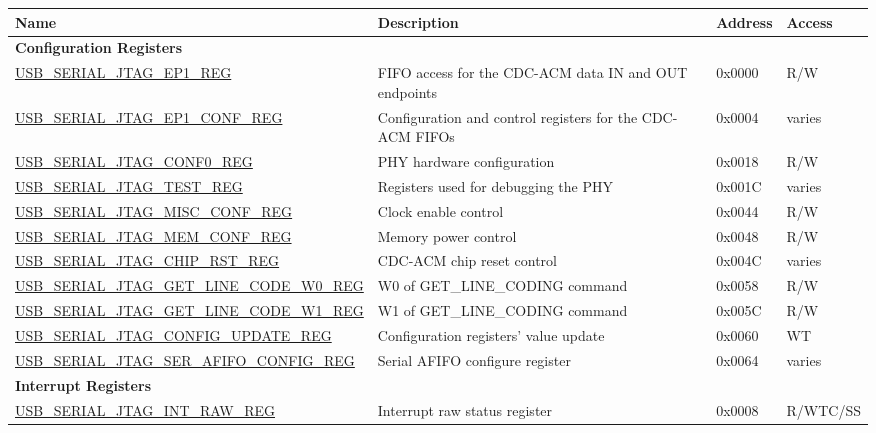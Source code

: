 \begin{longtable}{ | p{7.3cm} | p{5.7cm} | p{1.2cm} | p{1.5cm} | }
\hline\rowcolor{lightgray}
\textbf{Name} & \textbf{Description} &  \textbf{Address} & \textbf{Access} \\ \hline
\endhead
\multicolumn{4}{|l|}{\textbf{Configuration Registers}} \\ \hline
\hyperref[regdesc:USBSERIALJTAGEP1REG]{USB\_SERIAL\_JTAG\_EP1\_REG} & FIFO access for the CDC-ACM data IN and OUT endpoints & 0x0000 & R/W \\ \hline
\hyperref[regdesc:USBSERIALJTAGEP1CONFREG]{USB\_SERIAL\_JTAG\_EP1\_CONF\_REG} & Configuration and control registers for the CDC-ACM FIFOs & 0x0004 & varies \\ \hline
\hyperref[regdesc:USBSERIALJTAGCONF0REG]{USB\_SERIAL\_JTAG\_CONF0\_REG} & PHY hardware configuration & 0x0018 & R/W \\ \hline
\hyperref[regdesc:USBSERIALJTAGTESTREG]{USB\_SERIAL\_JTAG\_TEST\_REG} & Registers used for debugging the PHY & 0x001C & varies \\ \hline
\hyperref[regdesc:USBSERIALJTAGMISCCONFREG]{USB\_SERIAL\_JTAG\_MISC\_CONF\_REG} & Clock enable control & 0x0044 & R/W \\ \hline
\hyperref[regdesc:USBSERIALJTAGMEMCONFREG]{USB\_SERIAL\_JTAG\_MEM\_CONF\_REG} & Memory power control & 0x0048 & R/W \\ \hline
\hyperref[regdesc:USBSERIALJTAGCHIPRSTREG]{USB\_SERIAL\_JTAG\_CHIP\_RST\_REG} & CDC-ACM chip reset control & 0x004C & varies \\ \hline
\hyperref[regdesc:USBSERIALJTAGGETLINECODEW0REG]{USB\_SERIAL\_JTAG\_GET\_LINE\_CODE\_W0\_REG} & W0 of GET\_LINE\_CODING command & 0x0058 & R/W \\ \hline
\hyperref[regdesc:USBSERIALJTAGGETLINECODEW1REG]{USB\_SERIAL\_JTAG\_GET\_LINE\_CODE\_W1\_REG} & W1 of GET\_LINE\_CODING command & 0x005C & R/W \\ \hline
\hyperref[regdesc:USBSERIALJTAGCONFIGUPDATEREG]{USB\_SERIAL\_JTAG\_CONFIG\_UPDATE\_REG} & Configuration registers' value update & 0x0060 & WT \\ \hline
\hyperref[regdesc:USBSERIALJTAGSERAFIFOCONFIGREG]{USB\_SERIAL\_JTAG\_SER\_AFIFO\_CONFIG\_REG} & Serial AFIFO configure register & 0x0064 & varies \\ \hline
\multicolumn{4}{|l|}{\textbf{Interrupt Registers}} \\ \hline
\hyperref[regdesc:USBSERIALJTAGINTRAWREG]{USB\_SERIAL\_JTAG\_INT\_RAW\_REG} & Interrupt raw status register & 0x0008 & R/WTC/SS \\ \hline

\end{longtable}
